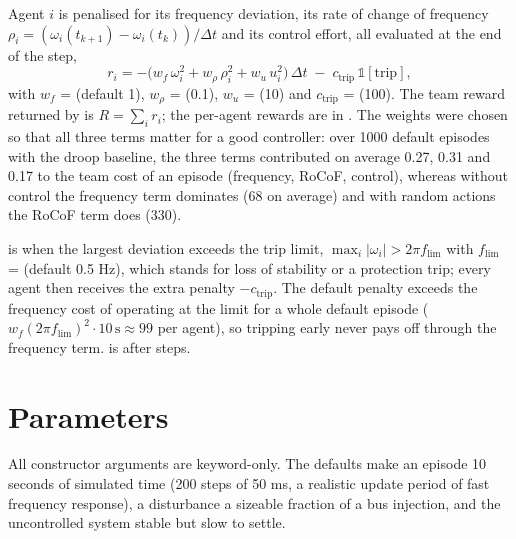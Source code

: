 Agent $i$ is penalised for its frequency deviation, its rate of change of
frequency $\rho_i = (\omega_i(t_{k+1}) - \omega_i(t_k))/\Delta t$ and its control
effort, all evaluated at the end of the step,
\begin{equation}
  r_i = -\bigl(w_f\, \omega_i^2 + w_\rho\, \rho_i^2 + w_u\, u_i^2\bigr)\,\Delta t
        \;-\; c_{\mathrm{trip}}\, \mathbb{1}[\text{trip}],
  \label{eq:power-grid-reward}
\end{equation}
with $w_f$ =  (default 1), $w_\rho$ =  (0.1),
$w_u$ =  (10) and $c_{\mathrm{trip}}$ =  (100). The
team reward returned by  is $R = \sum_i r_i$; the per-agent rewards
are in . The weights were chosen so that all three
terms matter for a good controller: over 1000 default episodes with the droop
baseline, the three terms contributed on average 0.27, 0.31 and 0.17 to the
team cost of an episode (frequency, RoCoF, control), whereas without control
the frequency term dominates (68 on average) and with random actions the RoCoF
term does (330).

 is  when the largest deviation exceeds the trip
limit, $\max_i |\omega_i| > 2\pi f_{\lim}$ with $f_{\lim}$ =
 (default 0.5 Hz), which stands for loss of stability or a
protection trip; every agent then receives the extra penalty
$-c_{\mathrm{trip}}$. The default penalty exceeds the frequency cost of
operating at the limit for a whole default episode
($w_f (2\pi f_{\lim})^2 \cdot 10\,\mathrm{s} \approx 99$ per agent), so tripping
early never pays off through the frequency term.  is
 after  steps.

\section{Parameters}\label{sec:power-grid-params}

All constructor arguments are keyword-only. The defaults make an episode
10 seconds of simulated time (200 steps of 50 ms, a realistic update period of
fast frequency response), a disturbance a sizeable fraction of a bus injection,
and the uncontrolled system stable but slow to settle.

